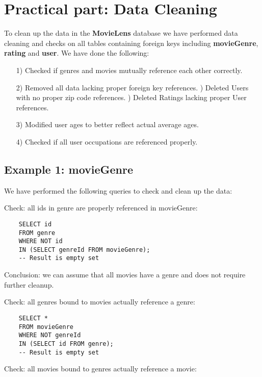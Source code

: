 \section{Practical part: Data Cleaning}

To clean up the data in the \textbf{MovieLens} database we have performed data cleaning and checks on all tables containing foreign keys including \textbf{movieGenre}, \textbf{rating} and \textbf{user}. We have done the following: 

\begin{itemize}
	\item [1)] Checked if genres and movies mutually reference each other correctly.
	\item [2)] Removed all data lacking proper foreign key references.
	) Deleted Users with no proper zip code references. 
	) Deleted Ratings lacking proper User references.
	\item [3)] Modified user ages to better reflect actual average ages. 
	\item [4)] Checked if all user occupations are referenced properly. 
\end{itemize}

\subsection{Example 1: movieGenre}

We have performed the following queries to check and clean up the data: 

Check: all ids in genre are properly referenced in movieGenre: 

\begin{verbatim}
	SELECT id 
	FROM genre 
	WHERE NOT id 
	IN (SELECT genreId FROM movieGenre); 
	-- Result is empty set 
\end{verbatim}

\noindent Conclusion: we can assume that all movies have a genre and does not require further cleanup. \newline

\noindent Check: all genres bound to movies actually reference a genre:

\begin{verbatim}
	SELECT * 
	FROM movieGenre
	WHERE NOT genreId
	IN (SELECT id FROM genre);
	-- Result is empty set 
\end{verbatim}

\noindent Check: all movies bound to genres actually reference a movie:

